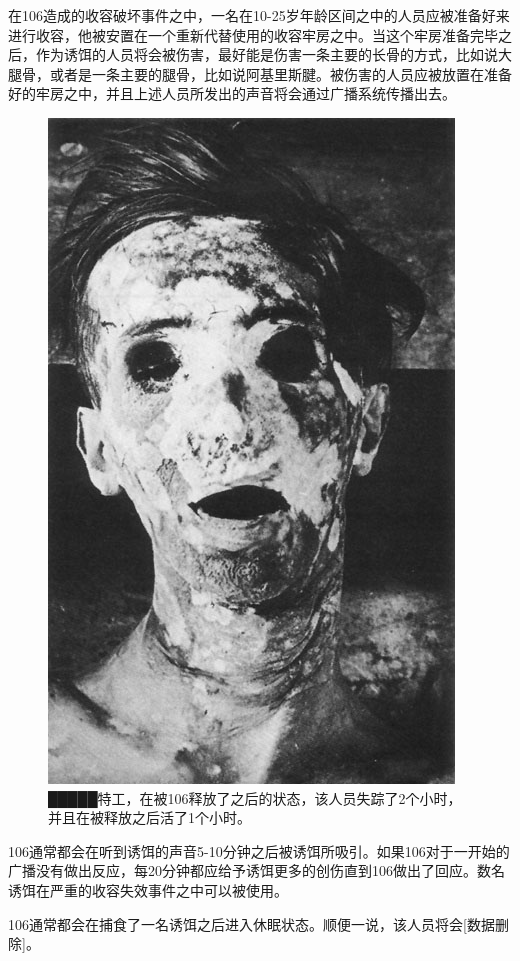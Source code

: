 
在106造成的收容破坏事件之中，一名在10-25岁年龄区间之中的人员应被准备好来进行收容，他被安置在一个重新代替使用的收容牢房之中。当这个牢房准备完毕之后，作为诱饵的人员将会被伤害，最好能是伤害一条主要的长骨的方式，比如说大腿骨，或者是一条主要的腿骨，比如说阿基里斯腱。被伤害的人员应被放置在准备好的牢房之中，并且上述人员所发出的声音将会通过广播系统传播出去。

\begin{figure}[H]
    \centering
    \includegraphics[width=0.5\linewidth]{images/SCP.106.4.jpg}
    \caption*{█████特工，在被106释放了之后的状态，该人员失踪了2个小时，并且在被释放之后活了1个小时。}
\end{figure}

106通常都会在听到诱饵的声音5-10分钟之后被诱饵所吸引。如果106对于一开始的广播没有做出反应，每20分钟都应给予诱饵更多的创伤直到106做出了回应。数名诱饵在严重的收容失效事件之中可以被使用。

106通常都会在捕食了一名诱饵之后进入休眠状态。顺便一说，该人员将会{[}数据删除]。
